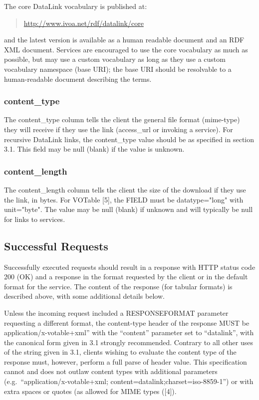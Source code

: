 \documentclass[11pt,a4paper]{ivoa}
\newcommand{\attval}[2]{#1={\allowbreak}{"}#2{"}}
\begin{document}
The core DataLink vocabulary is published at:
\begin{quote}
  \url{http://www.ivoa.net/rdf/datalink/core}
\end{quote}
and the latest version is available as a human readable document and an
RDF XML document. Services are encouraged to use the core vocabulary
as much as possible, but may use a custom vocabulary as long as they
use a custom vocabulary namespace (base URI); the base URI should be
resolvable to a human-readable document describing the terms.


\subsubsection{content\_type}

The content\_type column tells the client the general file format
(mime-type) they will receive if they use the link
(access\_url or invoking a service).
For recursive DataLink links, the content\_type value should
be as specified in section 3.1.
This field may be null (blank) if the value is unknown.


\subsubsection{content\_length}

The content\_length column tells the client the size of the download
if they use the link, in bytes. For VOTable [5], the FIELD must be
\attval{datatype}{long} with \attval{unit}{byte}.
The value may be null (blank)
if unknown and will typically be null for links to services.


\subsection{Successful Requests}

Successfully executed requests should result in a response with HTTP
status code 200 (OK) and a response in the format requested by the client
or in the default format for the service. The content of the response
(for tabular formats) is described above,
with some additional details below.

Unless the incoming request included a RESPONSEFORMAT parameter requesting
a different format, the content-type header of the response MUST be
application/x-votable+xml'' with the
``content'' parameter set to ``datalink'',
with the canonical form given in 3.1 strongly recommended. Contrary to
all other uses of the string given in 3.1, clients wishing to evaluate
the content type of the response must, however, perform a full parse
of header value. This specification cannot and does not outlaw content
types with additional parameters
(e.g.\ ``application/x-votable+xml; content=datalink;charset=iso-8859-1'')
or with extra spaces or quotes
(as allowed for MIME types ([4]).
\end{document}

